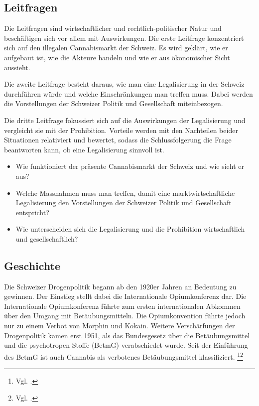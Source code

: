 \documentclass[../main.tex]{subfiles}
\begin{document}
	 \subsection{Leitfragen}
	 Die Leitfragen sind wirtschaftlicher und rechtlich-politischer Natur und beschäftigen sich vor allem mit Auswirkungen.
	 Die erste Leitfrage konzentriert sich auf den illegalen Cannabismarkt der Schweiz.
	 Es wird geklärt, wie er aufgebaut ist, wie die Akteure handeln und wie er aus ökonomischer Sicht aussieht.\vspace{0.3cm}
	 
	 \noindent
	 Die zweite Leitfrage besteht daraus, wie man eine Legalisierung in der Schweiz durchführen würde und welche Einschränkungen man treffen muss.
	 Dabei werden die Vorstellungen der Schweizer Politik und Gesellschaft miteinbezogen.\vspace{0.3cm}
	 
	 \noindent
	 Die dritte Leitfrage fokussiert sich auf die Auswirkungen der Legalisierung und vergleicht sie mit der Prohibition. 
	 Vorteile werden mit den Nachteilen beider Situationen relativiert und bewertet, sodass die Schlussfolgerung die Frage beantworten kann, ob eine Legalisierung sinnvoll ist.\vspace{0.3cm}
	 
	 
	 \begin{itemize}
	 	\item Wie funktioniert der präsente Cannabismarkt der Schweiz und wie sieht er aus?
	 	\item Welche Massnahmen muss man treffen, damit eine marktwirtschaftliche Legalisierung den Vorstellungen der Schweizer Politik und Gesellschaft entspricht?
	
		\item Wie unterscheiden sich die Legalisierung und die Prohibition wirtschaftlich und gesellschaftlich?
	 \end{itemize}\vspace{0.3cm}
	 
	
	 
	 \subsection{Geschichte}
	 Die Schweizer Drogenpolitik begann ab den 1920er Jahren an Bedeutung zu gewinnen. 
	 Der Einstieg stellt dabei die Internationale Opiumkonferenz dar. 
	 Die Internationale Opiumkonferenz führte zum ersten internationalen Abkommen über den Umgang mit Betäubungsmitteln. 
	 Die Opiumkonvention führte jedoch nur zu einem Verbot von Morphin und Kokain. 
	 Weitere Verschärfungen der Drogenpolitik kamen erst 1951, als das Bundesgesetz über die Betäubungsmittel und die psychotropen Stoffe (BetmG) verabschiedet wurde.
	 Seit der Einführung des BetmG ist auch Cannabis als verbotenes Betäubungsmittel klassifiziert.%
	 \footnote{Vgl. \cite{brassel}.}\footnote{Vgl. \cite{admin-01}.}\\
	 	 
\end{document}
